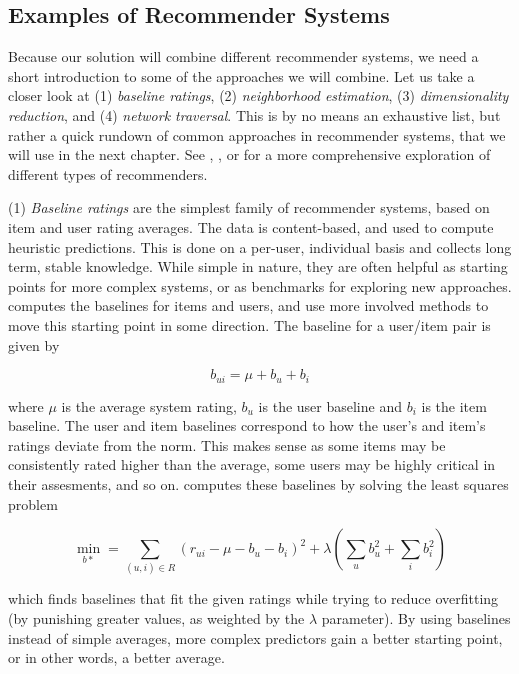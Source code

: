\subsection{Examples of Recommender Systems}
\label{subsec:recommender:examples}

Because our solution will combine different recommender systems, we need a short introduction to some of the approaches we will combine.
Let us take a closer look at (1) \emph{baseline ratings}, (2) \emph{neighborhood estimation}, (3) \emph{dimensionality reduction}, 
and (4) \emph{network traversal}. This is by no means an exhaustive list, but rather
a quick rundown of common approaches in recommender systems, that we will use in the next chapter.
See \cite{Adomavicius2005}, \cite{Pazzani2007}, \cite{Schafer2007} or \cite{Bjorkoy2010d} for a more comprehensive exploration of different types of recommenders.

(1) \emph{Baseline ratings} are the simplest family of recommender systems, based on item and user rating averages.
The data is content-based, and used to compute heuristic predictions. 
This is done on a per-user, individual basis and collects long term, stable knowledge.
While simple in nature, they are often helpful as starting points for more complex systems, or as 
benchmarks for exploring new approaches. \cite[p2]{Koren2008} computes the baselines for items and users, and
use more involved methods to move this starting point in some direction. 
The baseline for a user/item pair is given by

\begin{equation*}
  b_{ui} = \mu + b_u + b_i
\end{equation*}

where $\mu$ is the average system rating, $b_u$ is the user baseline and $b_i$ is the item baseline.
The user and item baselines correspond to how the user's and item's ratings deviate from the norm.
This makes sense as some items may be consistently rated higher than the average, some users may be 
highly critical in their assesments, and so on. \citeauthor{Koren2008} computes these baselines by solving the
least squares problem

\begin{equation*}
  \min_{b*} = \sum_{(u,i) \in R} (r_{ui} - \mu - b_u - b_i)^2 + \lambda ( \sum_{u} b_u^2 + \sum_{i} b_i^2 )
\end{equation*}

which finds baselines that fit the given ratings while trying to reduce overfitting
(by punishing greater values, as weighted by the $\lambda$ parameter). 
By using baselines instead of simple averages, more complex predictors gain a better starting point,
or in other words, a better average.

